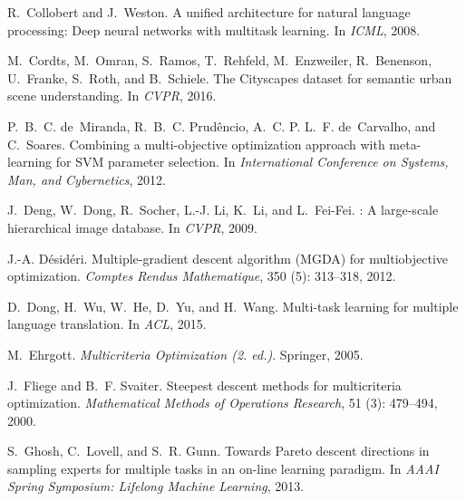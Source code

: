 \documentclass{article}
\begin{document}
{\begin{thebibliography}{60}
R.~Collobert and J.~Weston.
\newblock A unified architecture for natural language processing: Deep neural
  networks with multitask learning.
\newblock In \emph{ICML}, 2008.

M.~Cordts, M.~Omran, S.~Ramos, T.~Rehfeld, M.~Enzweiler, R.~Benenson,
  U.~Franke, S.~Roth, and B.~Schiele.
\newblock The {Cityscapes} dataset for semantic urban scene understanding.
\newblock In \emph{{CVPR}}, 2016.

P.~B.~C. de~Miranda, R.~B.~C. Prud{\^{e}}ncio, A.~C. P. L.~F. de~Carvalho, and
  C.~Soares.
\newblock Combining a multi-objective optimization approach with meta-learning
  for {SVM} parameter selection.
\newblock In \emph{International Conference on Systems, Man, and Cybernetics},
  2012.

J.~Deng, W.~Dong, R.~Socher, L.-J. Li, K.~Li, and L.~Fei-Fei.
: A large-scale hierarchical image database.
\newblock In \emph{{CVPR}}, 2009.

J.-A. D{\'e}sid{\'e}ri.
\newblock Multiple-gradient descent algorithm {(MGDA)} for multiobjective
  optimization.
\newblock \emph{Comptes Rendus Mathematique}, 350 (5):
  313--318, 2012.

D.~Dong, H.~Wu, W.~He, D.~Yu, and H.~Wang.
\newblock Multi-task learning for multiple language translation.
\newblock In \emph{ACL}, 2015.

M.~Ehrgott.
\newblock \emph{Multicriteria Optimization {(2.} ed.)}.
\newblock Springer, 2005.

J.~Fliege and B.~F. Svaiter.
\newblock Steepest descent methods for multicriteria optimization.
\newblock \emph{Mathematical Methods of Operations Research}, 51
  (3): 479--494, 2000.

S.~Ghosh, C.~Lovell, and S.~R. Gunn.
\newblock Towards {Pareto} descent directions in sampling experts for multiple
  tasks in an on-line learning paradigm.
\newblock In \emph{AAAI Spring Symposium: Lifelong Machine Learning}, 2013.


\end{thebibliography}}
\end{document}

